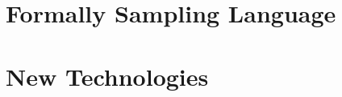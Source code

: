 \section{Formally Sampling Language}
\label{sec:litreview-sampling}




\section{New Technologies} %
\label{sec:litreview-newtech}


